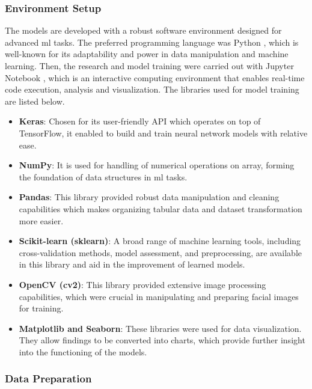 \subsubsection{Environment Setup}
The models are developed with a robust software environment designed for advanced \gls{ml} tasks.
The preferred programming language was Python \citep{python_2019_python}, which is well-known for its adaptability and power in data manipulation and machine learning.
Then, the research and model training were carried out with Jupyter Notebook \citep{jupyter_2019_project}, which is an interactive computing environment that enables real-time code execution, analysis and visualization.
The libraries used for model training are listed below.
\begin{itemize}
    \item \textbf{Keras}: Chosen for its user-friendly API which operates on top of TensorFlow, it enabled to build and train neural network models with relative ease. \citep{team_keras}
    \item \textbf{NumPy}: It is used for handling of numerical operations on array, forming the foundation of data structures in \gls{ml} tasks. \citep{numpy_2009_numpy}
    \item \textbf{Pandas}: This library provided robust data manipulation and cleaning capabilities which makes organizing tabular data and dataset transformation more easier. \citep{pandas_2018_python}
    \item \textbf{Scikit-learn (sklearn)}: A broad range of machine learning tools, including cross-validation methods, model assessment, and preprocessing, are available in this library and aid in the improvement of learned models. \citep{scikitlearn_2019_scikitlearn}
    \item \textbf{OpenCV (cv2)}: This library provided extensive image processing capabilities, which were crucial in manipulating and preparing facial images for training. \citep{opencv_2019_opencv}
    \item \textbf{Matplotlib and Seaborn}: These libraries were used for data visualization. They allow findings to be converted into charts, which provide further insight into the functioning of the models. \citep{matplotlib_2012_matplotlib} \citep{seaborn_2012_seaborn}
\end{itemize}
\subsubsection{Data Preparation}
